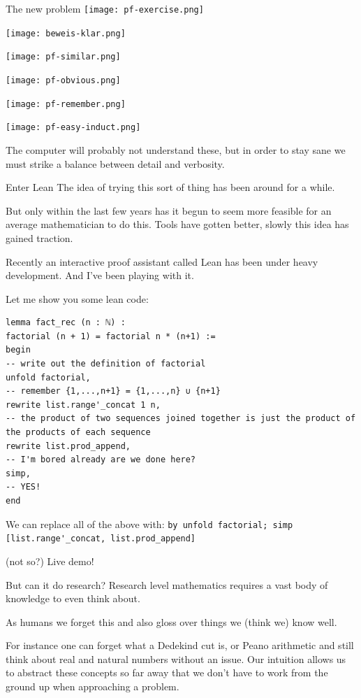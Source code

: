 \documentclass{beamer}
\theoremstyle{plain}
\begin{document}
{\begin{frame}{The new problem}
    \texttt{[image: pf-exercise.png]}\pause

    \texttt{[image: beweis-klar.png]}\pause

    \texttt{[image: pf-similar.png]}\pause

    \texttt{[image: pf-obvious.png]}\pause

    \texttt{[image: pf-remember.png]}\pause

    \texttt{[image: pf-easy-induct.png]}\pause

    The computer will probably not understand these, but in order to stay sane we must strike a balance between detail and verbosity.
\end{frame}

\begin{frame}{Enter Lean}
    The idea of trying this sort of thing has been around for a while. \pause

    But only within the last few years has it begun to seem more feasible for an average mathematician to do this. Tools have gotten better, slowly this idea has gained traction.\pause

    Recently an interactive proof assistant called Lean has been under heavy development. And I've been playing with it.

    Let me show you some lean code:
\end{frame}

\begin{frame}[fragile]
\begin{lstlisting}
lemma fact_rec (n : ℕ) :
factorial (n + 1) = factorial n * (n+1) :=
begin
-- write out the definition of factorial
unfold factorial,
-- remember {1,...,n+1} = {1,...,n} ∪ {n+1}
rewrite list.range'_concat 1 n,
-- the product of two sequences joined together is just the product of the products of each sequence
rewrite list.prod_append,
-- I'm bored already are we done here?
simp,
-- YES!
end
\end{lstlisting}\pause
We can replace all of the above with: \lstinline{by unfold factorial; simp [list.range'_concat, list.prod_append]}

\end{frame}

\begin{frame}{(not so?) Live demo!}
\end{frame}

\begin{frame}{But can it do research?}
    Research level mathematics requires a vast body of knowledge to even think about.
    \pause

    As humans we forget this and also gloss over things we (think we) know well.
    \pause

    For instance one can forget what a Dedekind cut is, or Peano arithmetic and still think about real and natural numbers without an issue.
    Our intuition allows us to abstract these concepts so far away that we don't have to work from the ground up when approaching a problem.

\end{frame}}
\end{document}
